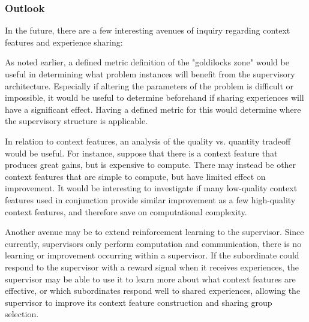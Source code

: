 \documentclass[letterpaper]{article}
\begin{document}
\subsubsection{Outlook}
In the future, there are a few interesting avenues of inquiry regarding context features and experience sharing:

As noted earlier, a defined metric definition of the "goldilocks zone" would be useful in determining what problem instances will benefit from the supervisory architecture.  Especially if altering the parameters of the problem is difficult or impossible, it would be useful to determine beforehand if sharing experiences will have a significant effect.  Having a defined metric for this would determine where the supervisory structure is applicable.

In relation to context features, an analysis of the quality vs. quantity tradeoff would be useful.  For instance, suppose that there is a context feature that produces great gains, but is expensive to compute.  There may instead be other context features that are simple to compute, but have limited effect on improvement.  It would be interesting to investigate if many low-quality context features used in conjunction provide similar improvement as a few high-quality context features, and therefore save on computational complexity.

Another avenue may be to extend reinforcement learning to the supervisor.  Since currently, supervisors only perform computation and communication, there is no learning or improvement occurring within a supervisor.  If the subordinate could respond to the supervisor with a reward signal when it receives experiences, the supervisor may be able to use it to learn more about what context features are effective, or which subordinates respond well to shared experiences, allowing the supervisor to improve its context feature construction and sharing group selection.

\footnotesize


\end{document}
